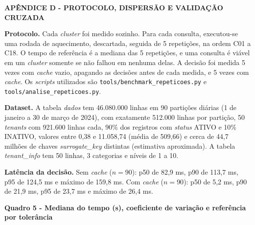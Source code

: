 \newpage

\begin{center}
\textbf{APÊNDICE D - PROTOCOLO, DISPERSÃO E VALIDAÇÃO CRUZADA}
\end{center}

\vspace{0.5cm}

\textbf{Protocolo.} Cada \textit{cluster} foi medido sozinho. Para cada consulta, executou-se uma rodada de aquecimento, descartada, seguida de 5 repetições, na ordem C01 a C18. O tempo de referência é a mediana das 5 repetições, e uma consulta é viável em um \textit{cluster} somente se não falhou em nenhuma delas. A decisão foi medida 5 vezes com \textit{cache} vazio, apagando as decisões antes de cada medida, e 5 vezes com \textit{cache}. Os \textit{scripts} utilizados são \texttt{tools/\allowbreak benchmark\_\allowbreak repeticoes.py} e \texttt{tools/\allowbreak analise\_\allowbreak repeticoes.py}.

\textbf{Dataset.} A tabela \textit{dados} tem 46.080.000 linhas em 90 partições diárias (1 de janeiro a 30 de março de 2024), com exatamente 512.000 linhas por partição, 50 \textit{tenants} com 921.600 linhas cada, 90\% dos registros com \textit{status} ATIVO e 10\% INATIVO, valores entre 0,38 e 11.058,74 (média de 509,66) e cerca de 44,7 milhões de chaves \textit{surrogate\_key} distintas (estimativa aproximada). A tabela \textit{tenant\_info} tem 50 linhas, 3 categorias e níveis de 1 a 10.

\textbf{Latência da decisão.} Sem \textit{cache} ($n = 90$): p50 de 82,9 ms, p90 de 113,7 ms, p95 de 124,5 ms e máximo de 159,8 ms. Com \textit{cache} ($n = 90$): p50 de 5,2 ms, p90 de 21,9 ms, p95 de 23,7 ms e máximo de 26,4 ms.

\begin{center}
\textbf{Quadro 5 - Mediana do tempo (s), coeficiente de variação e referência por tolerância}
\end{center}

